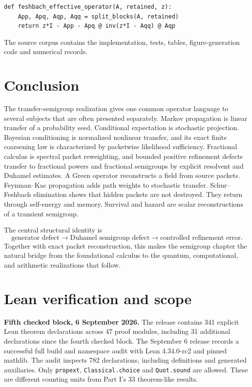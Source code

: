 \documentclass[11pt,letterpaper]{article}
\theoremstyle{plain}
\theoremstyle{plain}
\theoremstyle{plain}
\theoremstyle{definition}
\theoremstyle{definition}
\theoremstyle{definition}
\theoremstyle{definition}
\theoremstyle{definition}
\theoremstyle{remark}
\theoremstyle{remark}
\theoremstyle{remark}
\theoremstyle{remark}
\theoremstyle{remark}
\theoremstyle{remark}
\begin{document}
\begin{lstlisting}[caption={Finite Schur-Feshbach effective operator.}]
def feshbach_effective_operator(A, retained, z):
    App, Apq, Aqp, Aqq = split_blocks(A, retained)
    return z*I - App - Apq @ inv(z*I - Aqq) @ Aqp
\end{lstlisting}

The source corpus contains the implementation, tests, tables, figure-generation code and numerical records.

\FloatBarrier
\section{Conclusion}\label{core:section:19}

The transfer-semigroup realization gives one common operator language to several subjects that are often presented separately. Markov propagation is linear transfer of a probability seed. Conditional expectation is stochastic projection. Bayesian conditioning is normalized nonlinear transfer, and its exact finite coarsening law is characterized by packetwise likelihood sufficiency. Fractional calculus is spectral packet reweighting, and bounded positive refinement defects transfer to fractional powers and fractional semigroups by explicit resolvent and Duhamel estimates. A Green operator reconstructs a field from source packets. Feynman--Kac propagation adds path weights to stochastic transfer. Schur--Feshbach elimination shows that hidden packets are not destroyed. They return through self-energy and memory. Survival and hazard are scalar reconstructions of a transient semigroup.

The central structural identity is
\[
\boxed{
\text{generator defect}
\longrightarrow
\text{Duhamel semigroup defect}
\longrightarrow
\text{controlled refinement error}.
}
\]
Together with exact packet reconstruction, this makes the semigroup chapter the natural bridge from the foundational calculus to the quantum, computational, and arithmetic realizations that follow.

\clearpage
\appendix
\FloatBarrier
\section{Lean verification and scope}\label{core:section:20}\label{core:sec:lean-status}
\noindent\textbf{Fifth checked block, 6 September 2026.}
The release contains 341 explicit Lean theorem declarations across 47 proof modules,
including 31 additional declarations since the fourth checked block. The September 6 release records a successful full
build and namespace audit with Lean 4.34.0-rc2 and pinned mathlib. The audit
inspects 782 declarations, including definitions and generated auxiliaries. Only
\texttt{propext}, \texttt{Classical.choice} and \texttt{Quot.sound} are allowed.
These are different counting units from Part I's 33 theorem-like results.
\end{document}
